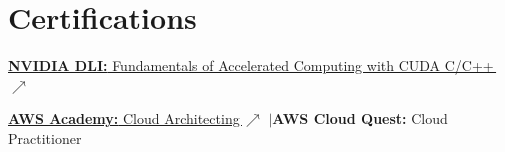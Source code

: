 \section{Certifications}
 \begin{itemize}[leftmargin=0.15in, label={}, itemsep=1pt, topsep=0pt, parsep=0pt, partopsep=0pt]
    \small{
     \item \href{https://courses.nvidia.com/certificates/f4562fbcfdb54cc086b362b4a8e33f64/}{\textbf{NVIDIA DLI:} Fundamentals of Accelerated Computing with CUDA C/C++\,$\nearrow$}
     \item \href{https://www.credly.com/go/lq267fnl}{\textbf{AWS Academy:} Cloud Architecting\,$\nearrow$}
       \enspace$|$\enspace \textbf{AWS Cloud Quest:} Cloud Practitioner
    }
 \end{itemize}
